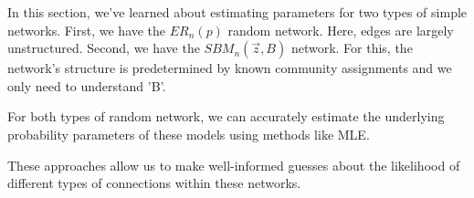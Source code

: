 In this section, we've learned about estimating parameters for two types of simple networks. First, we have the $ER_n(p)$ random network. Here, edges are largely unstructured. Second, we have the $SBM_n(\vec z, B)$ network. For this, the network's structure is predetermined by known community assignments and we only need to understand 'B'.

For both types of random network, we can accurately estimate the underlying probability parameters of these models using methods like MLE.

These approaches allow us to make well-informed guesses about the likelihood of different types of connections within these networks.

\newpage